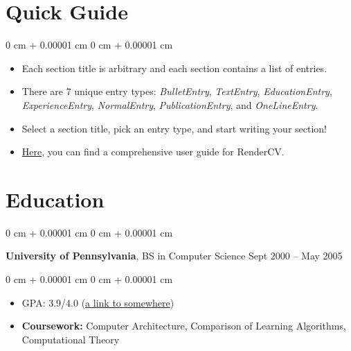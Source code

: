 \documentclass[10pt, letterpaper]{article}
\newenvironment{highlights}{
    \begin{itemize}[
        topsep=0.10 cm,
        parsep=0.10 cm,
        partopsep=0pt,
        itemsep=0pt,
        leftmargin=0 cm + 10pt
    ]
}{
    \end{itemize}
} %
\newenvironment{highlightsforbulletentries}{
    \begin{itemize}[
        topsep=0.10 cm,
        parsep=0.10 cm,
        partopsep=0pt,
        itemsep=0pt,
        leftmargin=10pt
    ]
}{
    \end{itemize}
} %
\newenvironment{onecolentry}{
    \begin{adjustwidth}{
        0 cm + 0.00001 cm
    }{
        0 cm + 0.00001 cm
    }
}{
    \end{adjustwidth}
} %
\newenvironment{twocolentry}[2][]{
    \onecolentry
    \def\secondColumn{#2}
    \setcolumnwidth{\fill, 4.5 cm}
    \begin{paracol}{2}
}{
    \switchcolumn \raggedleft \secondColumn
    \end{paracol}
    \endonecolentry
} %
\begin{document}
    
    \section{Quick Guide}

    \begin{onecolentry}
        \begin{highlightsforbulletentries}


        \item Each section title is arbitrary and each section contains a list of entries.

        \item There are 7 unique entry types: \textit{BulletEntry}, \textit{TextEntry}, \textit{EducationEntry}, \textit{ExperienceEntry}, \textit{NormalEntry}, \textit{PublicationEntry}, and \textit{OneLineEntry}.

        \item Select a section title, pick an entry type, and start writing your section!

        \item \href{https://docs.rendercv.com/user_guide/}{Here}, you can find a comprehensive user guide for RenderCV.


        \end{highlightsforbulletentries}
    \end{onecolentry}

    \section{Education}



        
        \begin{twocolentry}{
            Sept 2000 – May 2005
        }
            \textbf{University of Pennsylvania}, BS in Computer Science\end{twocolentry}

        \vspace{0.10 cm}
        \begin{onecolentry}
            \begin{highlights}
                \item GPA: 3.9/4.0 (\href{https://example.com}{a link to somewhere})
                \item \textbf{Coursework:} Computer Architecture, Comparison of Learning Algorithms, Computational Theory
            \end{highlights}
        \end{onecolentry}
\end{document}
